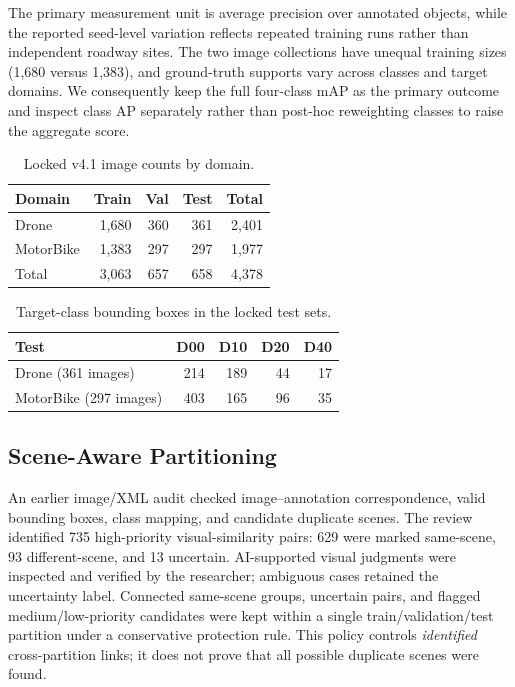 \documentclass[conference,a4paper]{IEEEtran}
\begin{document}
The primary measurement unit is average precision over annotated objects, while the reported seed-level variation reflects repeated training runs rather than independent roadway sites. The two image collections have unequal training sizes (1,680 versus 1,383), and ground-truth supports vary across classes and target domains. We consequently keep the full four-class mAP as the primary outcome and inspect class AP separately rather than post-hoc reweighting classes to raise the aggregate score.

\begin{table}[t]
\centering\caption{Locked v4.1 image counts by domain.}\label{tab:counts}
\begin{tabular}{lrrrr}\toprule
Domain & Train & Val & Test & Total\\\midrule
Drone & 1,680 & 360 & 361 & 2,401\\
MotorBike & 1,383 & 297 & 297 & 1,977\\\midrule
Total & 3,063 & 657 & 658 & 4,378\\\bottomrule
\end{tabular}
\end{table}

\begin{table}[t]
\centering\caption{Target-class bounding boxes in the locked test sets.}\label{tab:boxes}
\begin{tabular}{lrrrr}\toprule
Test & D00 & D10 & D20 & D40\\\midrule
Drone (361 images) & 214 & 189 & 44 & 17\\
MotorBike (297 images) & 403 & 165 & 96 & 35\\\bottomrule
\end{tabular}
\end{table}

\subsection{Scene-Aware Partitioning}
An earlier image/XML audit checked image–annotation correspondence, valid bounding boxes, class mapping, and candidate duplicate scenes. The review identified 735 high-priority visual-similarity pairs: 629 were marked same-scene, 93 different-scene, and 13 uncertain. AI-supported visual judgments were inspected and verified by the researcher; ambiguous cases retained the uncertainty label. Connected same-scene groups, uncertain pairs, and flagged medium/low-priority candidates were kept within a single train/validation/test partition under a conservative protection rule. This policy controls \emph{identified} cross-partition links; it does not prove that all possible duplicate scenes were found.
\end{document}

